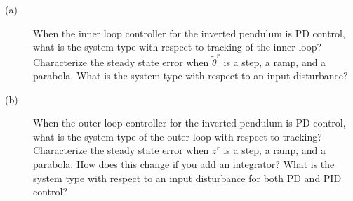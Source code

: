 \begin{description}
\item[]
\item[(a)] When the inner loop controller for the inverted pendulum is PD control, what is the system type with respect to tracking of the inner loop?  Characterize the steady state error when $\tilde{\theta}^r$ is a step, a ramp, and a parabola.  What is the system type with respect to an input disturbance?
\item[(b)] When the outer loop controller for the inverted pendulum is PD control, what is the system type of the outer loop with respect to tracking?  Characterize the steady state error when $z^r$ is a step, a ramp, and a parabola.  How does this change if you add an integrator?  What is the system type with respect to an input disturbance for both PD and PID control?  
\end{description}

